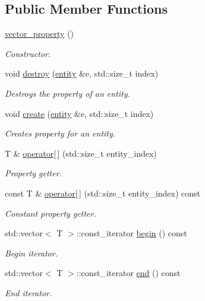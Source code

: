 \subsection*{Public Member Functions}
\begin{DoxyCompactItemize}
\item 
\hyperlink{classophidian_1_1entity_1_1vector__property_aebd7abc7f2a79b3cfa098ce9be6327dd}{vector\-\_\-property} ()
\begin{DoxyCompactList}\small\item\em Constructor. \end{DoxyCompactList}\item 
void \hyperlink{classophidian_1_1entity_1_1vector__property_a6b239378e987a33fd05c69bd57158bdc}{destroy} (\hyperlink{classophidian_1_1entity_1_1entity}{entity} \&e, std\-::size\-\_\-t index)
\begin{DoxyCompactList}\small\item\em Destroys the property of an entity. \end{DoxyCompactList}\item 
void \hyperlink{classophidian_1_1entity_1_1vector__property_a15ebc0490d8232671cd9111f11351acf}{create} (\hyperlink{classophidian_1_1entity_1_1entity}{entity} \&e, std\-::size\-\_\-t index)
\begin{DoxyCompactList}\small\item\em Creates property for an entity. \end{DoxyCompactList}\item 
T \& \hyperlink{classophidian_1_1entity_1_1vector__property_a2b372566da6796a1db0bd10b42696aec}{operator\mbox{[}$\,$\mbox{]}} (std\-::size\-\_\-t entity\-\_\-index)
\begin{DoxyCompactList}\small\item\em Property getter. \end{DoxyCompactList}\item 
const T \& \hyperlink{classophidian_1_1entity_1_1vector__property_a775e8ebd43e4f32a3f84ffc6b6a025b6}{operator\mbox{[}$\,$\mbox{]}} (std\-::size\-\_\-t entity\-\_\-index) const 
\begin{DoxyCompactList}\small\item\em Constant property getter. \end{DoxyCompactList}\item 
std\-::vector$<$ T $>$\-::const\-\_\-iterator \hyperlink{classophidian_1_1entity_1_1vector__property_a8c6f753870ea6946573d5db86f7ab8c9}{begin} () const 
\begin{DoxyCompactList}\small\item\em Begin iterator. \end{DoxyCompactList}\item 
std\-::vector$<$ T $>$\-::const\-\_\-iterator \hyperlink{classophidian_1_1entity_1_1vector__property_a2f52e3cd85861b854717c64b2d045df8}{end} () const 
\begin{DoxyCompactList}\small\item\em End iterator. \end{DoxyCompactList}\end{DoxyCompactItemize}


